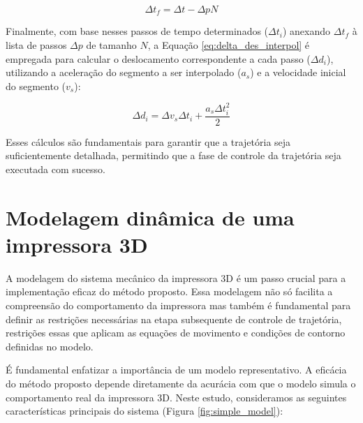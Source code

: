 \begin{equation}
    \label{eq:dt_interpol_last_step}
    \Delta t_f= \Delta t - \Delta p N 
\end{equation}

Finalmente, com base nesses passos de tempo determinados (\(\Delta t_i\)) anexando \(\Delta t_f\) à lista de passos \(\Delta p\) de tamanho \(N\), a Equação \ref{eq:delta_des_interpol} é empregada para calcular o deslocamento correspondente a cada passo (\(\Delta d_i\)), utilizando a aceleração do segmento a ser interpolado (\(a_s\)) e a velocidade inicial do segmento (\(v_s\)):

\begin{equation}
    \label{eq:delta_des_interpol}
    \Delta d_i = \Delta v_s \Delta t_i+ \frac{a_s \Delta t_i^2}{2} 
\end{equation}

Esses cálculos são fundamentais para garantir que a trajetória seja suficientemente detalhada, permitindo que a fase de controle da trajetória seja executada com sucesso.

\section{Modelagem dinâmica de uma impressora 3D} 
\label{sec:modelagem}

A modelagem do sistema mecânico da impressora 3D é um passo crucial para a implementação eficaz do método proposto. Essa modelagem não só facilita a compreensão do comportamento da impressora mas também é fundamental para definir as restrições necessárias na etapa subsequente de controle de trajetória, restrições essas que aplicam as equações de movimento e condições de contorno definidas no modelo.

É fundamental enfatizar a importância de um modelo representativo. A eficácia do método proposto depende diretamente da acurácia com que o modelo simula o comportamento real da impressora 3D. Neste estudo, consideramos as seguintes características principais do sistema (Figura \ref{fig:simple_model}):

